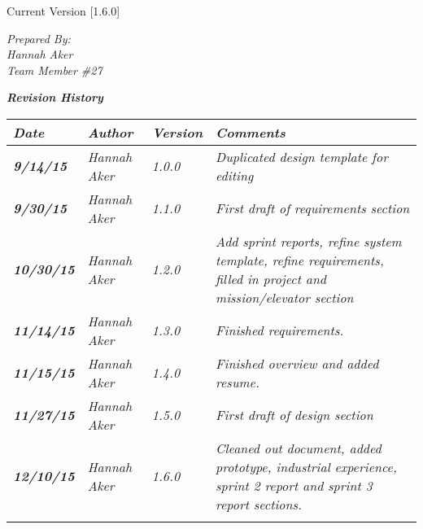 


Current Version [1.6.0]
\vspace*{5mm}

{
\noindent
\textit{Prepared By:}\\
\textit{Hannah Aker}\\
\textit{Team Member \#27}
}

\vfill
\noindent
{ \textit{\textbf{Revision History}}}\\
\begin{tabular}{|>{\raggedright}p{1.5cm}|>{\raggedright}p{3cm}|>{\raggedright}p{1.5cm}|>{\raggedright}p{9cm}|}
\hline
\textit{\textbf{Date}} &  \textit{\textbf{Author}} & \textit{\textbf{Version}} & \textit{\textbf{Comments}}\tabularnewline
\hline
 \textit{\textbf{9/14/15}} & \textit{Hannah Aker} & \textit{1.0.0} & \textit{Duplicated design template for editing}\tabularnewline
\hline
 \textit{\textbf{9/30/15}} & \textit{Hannah Aker} & \textit{1.1.0} & \textit{First draft of requirements section}\tabularnewline
 \hline
  \textit{\textbf{10/30/15}} & \textit{Hannah Aker} & \textit{1.2.0} & \textit{Add sprint reports, refine system template, refine requirements, filled in project and mission/elevator section}\tabularnewline
\hline
 \textit{\textbf{11/14/15}} & \textit{Hannah Aker} & \textit{1.3.0} & \textit{Finished requirements.}\tabularnewline
\hline
 \textit{\textbf{11/15/15}} & \textit{Hannah Aker} & \textit{1.4.0} & \textit{Finished overview and added resume.}\tabularnewline
\hline
 \textit{\textbf{11/27/15}} & \textit{Hannah Aker} & \textit{1.5.0} & \textit{First draft of design section}\tabularnewline
\hline
 \textit{\textbf{12/10/15}} & \textit{Hannah Aker} & \textit{1.6.0} & \textit{Cleaned out document, added prototype, industrial experience, sprint 2 report and sprint 3 report sections.}\tabularnewline
\hline
 &  &  & \tabularnewline
\hline
\end{tabular}
\vfill


